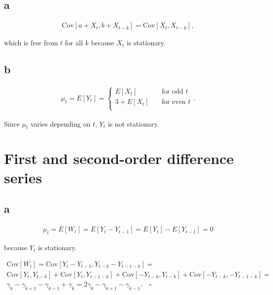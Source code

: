 \documentclass[]{book}
\begin{document}
\subsection*{a}\label{a-4}

\begin{gather*}\text{Cov}[a + X_t, b + X_{t-k}] =\text{Cov}[X_t, X_{t-k}],\end{gather*}

which is free from \(t\) for all \(k\) because \(X_t\) is stationary.

\subsection*{b}\label{b-4}

\begin{gather*}
  \mu_t = E[Y_t] = 
    \begin{cases}
      E[X_t]       & \quad \text{for odd } t\\
      3 + E[X_t]   & \quad \text{for even } t\\
    \end{cases}.
\end{gather*}

Since \(\mu_t\) varies depending on \(t\), \(Y_t\) is not stationary.

\section{First and second-order difference
series}\label{first-and-second-order-difference-series}

\subsection*{a}\label{a-5}

\begin{gather*}\mu_t = E[W_t] = E[Y_t - Y_{t-1}] = E[Y_t] - E[Y_{t-1}] = 0\end{gather*}

because \(Y_t\) is stationary.

\begin{gather*}
  \text{Cov}[W_t] = \text{Cov}[Y_t - Y_{t-1}, Y_{t-k} - Y_{t-1-k}] = \\
  \text{Cov}[Y_t, Y_{t-k}] + \text{Cov}[Y_t, Y_{t-1-k}] + \text{Cov}[-Y_{t-k}, Y_{t-k}] + \text{Cov}[-Y_{t-k}, -Y_{t-1-k}]=\\
  \gamma_k-\gamma_{k+1}-\gamma_{k-1}+\gamma_{k} = 2 \gamma_k - \gamma_{k+1} - \gamma_{k-1}. \quad \square
\end{gather*}
\end{document}
